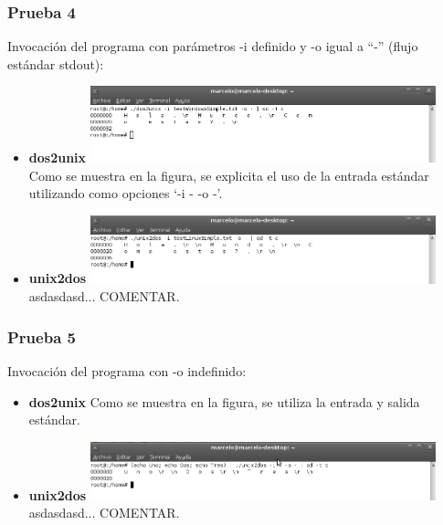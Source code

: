 \documentclass[a4paper,10pt]{article}
\begin{document}
    \subsubsection{Prueba 4}
    Invocaci\'on del programa con par\'ametros -i definido y -o igual a ``-'' (flujo est\'andar stdout):
      \begin{itemize}
      \item \textbf{dos2unix}
      \newline
      \includegraphics[width=10cm, viewport=0 0 897 199]{../Informe/Imagenes/prueba4-invocacion-dos2unix.png}
      \newline	
      Como se muestra en la figura, se explicita el uso de la entrada est\'andar utilizando como opciones 
      `-i - -o -'.
      \item \textbf{unix2dos}
      \newline
      \includegraphics[width=10cm, viewport=0 0 898 177]{../Informe/Imagenes/prueba4-invocacion-unix2dos.png}	
      \newline
      asdasdasd... COMENTAR.
      \end{itemize}

    \subsubsection{Prueba 5}
    Invocaci\'on del programa con -o indefinido:
      \begin{itemize}
      \item \textbf{dos2unix}
      \newline
      Como se muestra en la figura, se utiliza la entrada y salida est\'andar.
      \item \textbf{unix2dos}
      \newline
      \includegraphics[width=10cm, viewport=0 0 895 152]{../Informe/Imagenes/prueba5-invocacion-unix2dos.png}	
      \newline
      asdasdasd... COMENTAR.
      \end{itemize}
\end{document}
